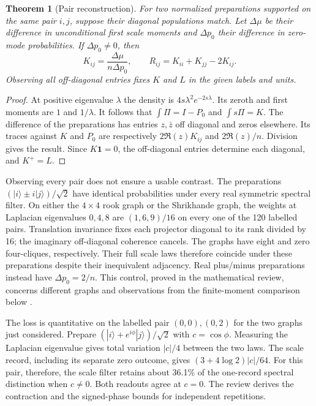 \documentclass[11pt,letterpaper]{article}
\newtheorem{theorem}{Theorem}[section]\newtheorem{proposition}[theorem]{Proposition}\newtheorem{corollary}[theorem]{Corollary}
\begin{document}
\begin{theorem}[Pair reconstruction]
For two normalized preparations supported on the same pair $i,j$, suppose their diagonal populations match. Let $\Delta\mu$ be their difference in unconditional first scale moments and $\Delta p_0$ their difference in zero-mode probabilities. If $\Delta p_0\ne0$, then
\[
 K_{ij}=\frac{\Delta\mu}{n\Delta p_0},\qquad R_{ij}=K_{ii}+K_{jj}-2K_{ij}.
\]
Observing all off-diagonal entries fixes $K$ and $L$ in the given labels and units.
\end{theorem}
\begin{proof}
At positive eigenvalue $\lambda$ the density is $4s\lambda^2e^{-2s\lambda}$. Its zeroth and first moments are $1$ and $1/\lambda$. It follows that $\int\Pi=I-P_0$ and $\int s\Pi=K$. The difference of the preparations has entries $z,\bar z$ off diagonal and zeros elsewhere. Its traces against $K$ and $P_0$ are respectively $2\Re(z)K_{ij}$ and $2\Re(z)/n$. Division gives the result. Since $K\mathbf 1=0$, the off-diagonal entries determine each diagonal, and $K^+=L$.
\end{proof}

Observing every pair does not ensure a usable contrast. The preparations $(|i\rangle\pm i|j\rangle)/\sqrt2$ have identical probabilities under every real symmetric spectral filter. On either the $4\times4$ rook graph or the Shrikhande graph, the weights at Laplacian eigenvalues $0,4,8$ are $(1,6,9)/16$ on every one of the 120 labelled pairs. Translation invariance fixes each projector diagonal to its rank divided by 16; the imaginary off-diagonal coherence cancels. The graphs have eight and zero four-cliques, respectively. Their full scale laws therefore coincide under these preparations despite their inequivalent adjacency. Real plus/minus preparations instead have $\Delta p_0=2/n$. This control, proved in the mathematical review, concerns different graphs and observations from the finite-moment comparison below \cite{brouwer}.

The loss is quantitative on the labelled pair $(0,0),(0,2)$ for the two graphs just considered. Prepare $(|i\rangle+e^{i\phi}|j\rangle)/\sqrt2$ with $c=\cos\phi$. Measuring the Laplacian eigenvalue gives total variation $|c|/4$ between the two laws. The scale record, including its separate zero outcome, gives $(3+4\log 2)|c|/64$. For this pair, therefore, the scale filter retains about 36.1\% of the one-record spectral distinction when $c\ne0$. Both readouts agree at $c=0$. The review derives the contraction and the signed-phase bounds for independent repetitions.
\end{document}
